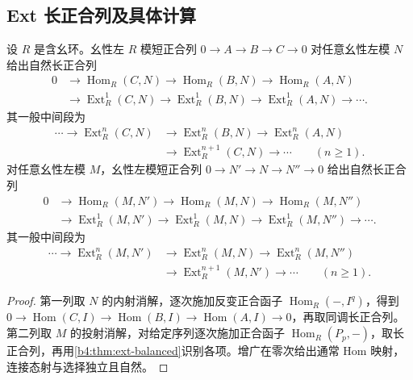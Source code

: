 \subsection{Ext 长正合列及具体计算}
\label{b4:subsec:0802:03}

\begin{theorem}\label{b4:thm:ext-long-exact}
	设 \(R\) 是含幺环。幺性左 \(R\) 模短正合列 \(0\to A\to B\to C\to0\) 对任意幺性左模 \(N\) 给出自然长正合列
	\[
		\begin{aligned}
			0&\longrightarrow\operatorname{Hom}_R(C,N)\longrightarrow\operatorname{Hom}_R(B,N) \longrightarrow\operatorname{Hom}_R(A,N)\\
			&\longrightarrow\operatorname{Ext}_R^1(C,N)\longrightarrow\operatorname{Ext}_R^1(B,N) \longrightarrow\operatorname{Ext}_R^1(A,N)\longrightarrow\cdots.
		\end{aligned}
	\]
	其一般中间段为
	\[
		\begin{aligned}
			\cdots\longrightarrow\operatorname{Ext}_R^n(C,N) &\longrightarrow\operatorname{Ext}_R^n(B,N) \longrightarrow\operatorname{Ext}_R^n(A,N)\\
			&\longrightarrow\operatorname{Ext}_R^{n+1}(C,N)\longrightarrow\cdots \qquad(n\ge1).
		\end{aligned}
	\]
	对任意幺性左模 \(M\)，幺性左模短正合列 \(0\to N'\to N\to N''\to0\) 给出自然长正合列
	\[
		\begin{aligned}
			0&\longrightarrow\operatorname{Hom}_R(M,N')\longrightarrow\operatorname{Hom}_R(M,N) \longrightarrow\operatorname{Hom}_R(M,N'')\\
			&\longrightarrow\operatorname{Ext}_R^1(M,N')\longrightarrow\operatorname{Ext}_R^1(M,N) \longrightarrow\operatorname{Ext}_R^1(M,N'')\longrightarrow\cdots.
		\end{aligned}
	\]
	其一般中间段为
	\[
		\begin{aligned}
			\cdots\longrightarrow\operatorname{Ext}_R^n(M,N') &\longrightarrow\operatorname{Ext}_R^n(M,N) \longrightarrow\operatorname{Ext}_R^n(M,N'')\\
			&\longrightarrow\operatorname{Ext}_R^{n+1}(M,N')\longrightarrow\cdots \qquad(n\ge1).
		\end{aligned}
	\]
\end{theorem}
\begin{proof}
	第一列取 \(N\) 的内射消解，逐次施加反变正合函子 \(\operatorname{Hom}_R(-,I^q)\)，得到 \(0\to\operatorname{Hom}(C,I)\to\operatorname{Hom}(B,I)\to\operatorname{Hom}(A,I)\to0\)，再取同调长正合列。第二列取 \(M\) 的投射消解，对给定序列逐次施加正合函子 \(\operatorname{Hom}_R(P_p,-)\)，取长正合列，再用\cref{b4:thm:ext-balanced}识别各项。增广在零次给出通常 Hom 映射，连接态射与选择独立且自然。
\end{proof}

